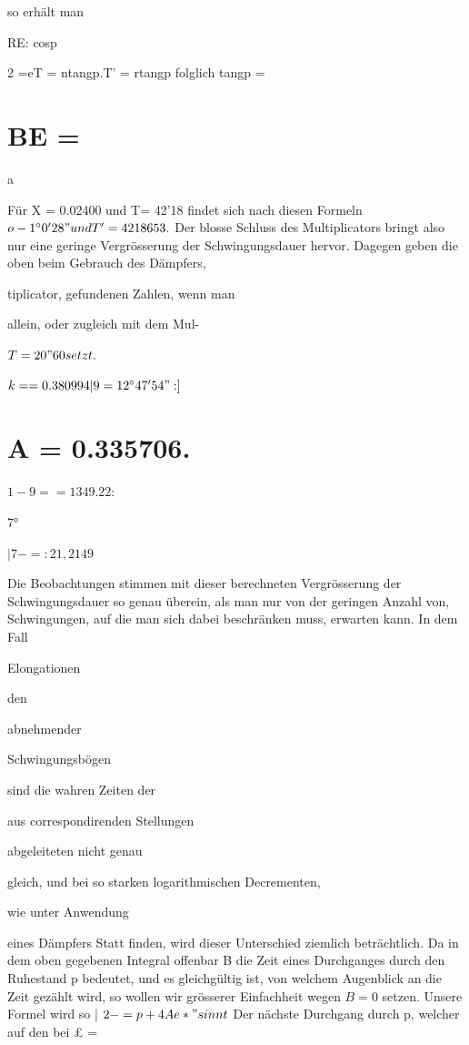 \documentclass[12pt,a4paper]{article}
\begin{document}
so erhält man

RE: cosp

2 =eT = ntangp.T’ = rtangp folglich tangp =

\section*{BE =}
a

Für X = 0.02400 und T= 42’18 findet sich nach diesen Formeln $o - 1^{\circ}0'28" und T^{\prime}= 4218653.$ Der blosse Schluss des Multiplicators bringt also nur eine geringe Vergrösserung der Schwingungsdauer hervor. Dagegen geben die oben beim Gebrauch des Dämpfers,

tiplicator, gefundenen Zahlen, wenn man

allein, oder zugleich mit dem Mul-

$T = 20" 60 setzt.$

$k == 0.380994 | 9 = 12^{\circ}47'54":]$

\section*{A = 0.335706.}
$1-9 == 13 49.22:$

7°

$| 7 -=:21,2149$

Die Beobachtungen stimmen mit dieser berechneten Vergrösserung der Schwingungsdauer so genau überein, als man nur von der geringen Anzahl von, Schwingungen, auf die man sich dabei beschränken muss, erwarten kann. In dem Fall

Elongationen

den

abnehmender

Schwingungsbögen

sind die wahren Zeiten der

aus correspondirenden Stellungen

abgeleiteten nicht genau

gleich, und bei so starken logarithmischen Decrementen,

wie unter Anwendung

eines Dämpfers Statt finden, wird dieser Unterschied ziemlich beträchtlich. Da in dem oben gegebenen Integral offenbar B die Zeit eines Durchganges durch den Ruhestand p bedeutet, und es gleichgültig ist, von welchem Augenblick an die Zeit gezählt wird, so wollen wir grösserer Einfachheit wegen $B= 0$ setzen. Unsere Formel wird so | $2 -=p+4Ae*"sinnt$ Der nächste Durchgang durch p, welcher auf den bei £ =
\end{document}
